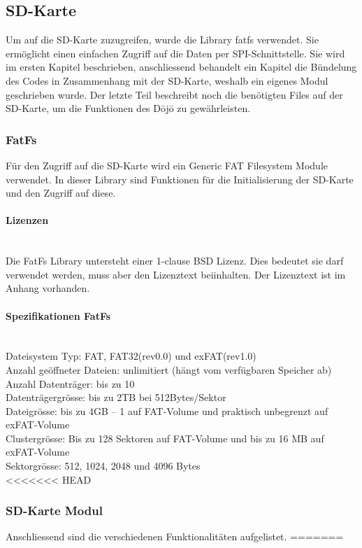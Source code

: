 \subsection{SD-Karte}\label{sec:sdKarte}
Um auf die SD-Karte zuzugreifen, wurde die Library fatfs verwendet. Sie ermöglicht einen einfachen Zugriff auf die Daten per SPI-Schnittstelle. Sie wird im ersten Kapitel beschrieben, anschliessend behandelt ein Kapitel die Bündelung des Codes in Zusammenhang mit der SD-Karte, weshalb ein eigenes Modul geschrieben wurde. Der letzte Teil beschreibt noch die benötigten Files auf der SD-Karte, um die Funktionen des Dōjō zu gewährleisten.

\subsubsection{FatFs}
Für den Zugriff auf die SD-Karte wird ein Generic FAT Filesystem Module verwendet. In dieser Library sind Funktionen für die Initialisierung der SD-Karte und den Zugriff auf diese.

\paragraph{Lizenzen}$~~$\\
Die FatFs Library untersteht einer 1-clause BSD Lizenz. Dies bedeutet sie darf verwendet werden, muss aber den Lizenztext beiinhalten. Der Lizenztext ist im Anhang vorhanden.

\paragraph{Spezifikationen FatFs}$~~$\\
Dateisystem Typ: FAT, FAT32(rev0.0) und exFAT(rev1.0)\\
Anzahl geöffneter Dateien: unlimitiert (hängt vom verfügbaren Speicher ab)\\
Anzahl Datenträger: bis zu 10\\
Datenträgergrösse: bis zu 2TB bei 512Bytes/Sektor\\
Dateigrösse: bis zu 4GB – 1 auf FAT-Volume und praktisch unbegrenzt auf exFAT-Volume\\
Clustergrösse: Bis zu 128 Sektoren auf FAT-Volume und bis zu 16 MB auf exFAT-Volume	\\
Sektorgrösse:  512, 1024, 2048 und 4096 Bytes \cite{FatFs}\\ 


<<<<<<< HEAD
\subsubsection{SD-Karte Modul}\label{sec:sdKarte modul}
Anschliessend sind die verschiedenen Funktionalitäten aufgelistet.
=======
